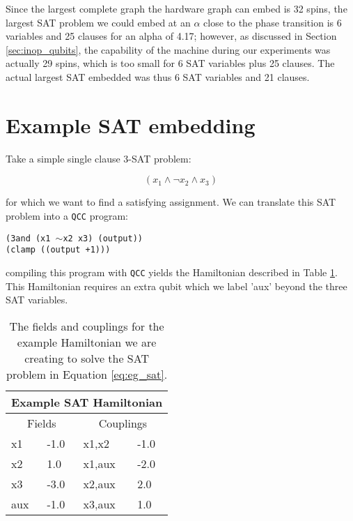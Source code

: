 Since the largest complete graph the hardware graph can embed is 32 spins, the largest SAT problem we could embed at an $\alpha$ close to the phase transition is 6 variables and 25 clauses for an alpha of 4.17; however, as discussed in Section \ref{sec:inop_qubits}, the capability of the \machine machine during our experiments was actually 29 spins, which is too small for 6 SAT variables plus 25 clauses.  The actual largest SAT embedded was thus 6 SAT variables and 21 clauses.

\section{Example SAT embedding}
Take a simple single clause 3-SAT problem:

\begin{equation}
	(x_1 \wedge \neg x_2 \wedge x_3)
	\label{eq:eg_sat}
\end{equation}

for which we want to find a satisfying assignment.  We can translate this SAT problem into a \texttt{QCC} program:

\begin{center}
	\texttt{(3and (x1 $\sim$x2 x3) (output))}\\
	\texttt{(clamp ((output +1)))}
\end{center}
compiling this program with \texttt{QCC} yields the Hamiltonian described in Table \ref{tab:eg_sat}.  This Hamiltonian requires an extra qubit which we label 'aux' beyond the three SAT variables.

\begin{table}
	\begin{center}
\begin{tabular}{ | l | l | l | l |}
	\hline
	\multicolumn{4}{|c|}{Example SAT Hamiltonian} \\ \hline
	\multicolumn{2}{|c|}{Fields} & \multicolumn{2}{c|}{Couplings} \\ \hline
	x1 & -1.0 & x1,x2 & -1.0 \\
	x2 & 1.0 & x1,aux & -2.0 \\
	x3 & -3.0 & x2,aux & 2.0 \\
	aux & -1.0 & x3,aux & 1.0 \\ \hline
\end{tabular}
\end{center}
\caption[Example SAT Hamiltonian]{The fields and couplings for the example Hamiltonian we are creating to solve the SAT problem in Equation \ref{eq:eg_sat}.}
\label{tab:eg_sat}
\end{table}

